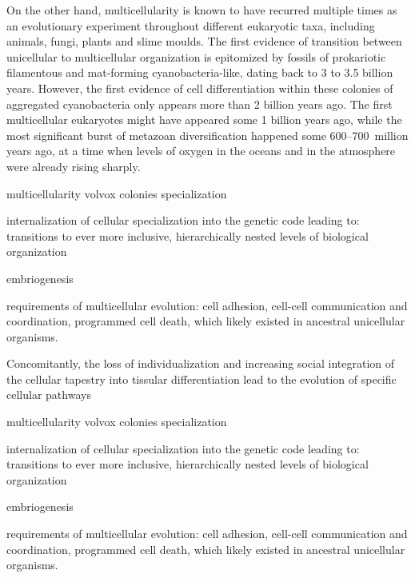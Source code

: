 \documentclass{tufte-book}
\begin{document}

On the other hand, multicellularity is known to have recurred multiple times as
an evolutionary experiment throughout different eukaryotic taxa, including
animals, fungi, plants and slime moulds.\cite{kaiser_building_2001} The first
evidence of transition between unicellular to multicellular organization is
epitomized by fossils of prokariotic filamentous and \mbox{mat-forming}
\mbox{cyanobacteria-like}, dating back to 3 to 3.5 billion
years.\cite{knoll_life_2003,schopf_microfossils_1993} However, the first
evidence of cell differentiation within these colonies of aggregated
cyanobacteria only appears more than 2 billion years
ago.\cite{tomitani_evolutionary_2006} The first multicellular eukaryotes might
have appeared some 1 billion years ago\cite{knoll_eukaryotic_2006}, while the
most significant burst of metazoan diversification happened some
\mbox{600--700~million} years ago, at a time when levels of oxygen in the oceans
and in the atmosphere were already rising
sharply.\cite{knoll_life_2003,schopf_microfossils_1993}



multicellularity
volvox
colonies
specialization

internalization of cellular specialization into the genetic code leading to:
transitions to ever more inclusive, hierarchically nested levels of biological
organization

embriogenesis

requirements of multicellular evolution: cell adhesion, cell-cell communication
and coordination, programmed cell death, which likely existed in ancestral
unicellular organisms\cite{grosberg_evolution_2007}.

Concomitantly, the loss of individualization and increasing social integration
of the cellular tapestry into tissular differentiation lead to the evolution of
specific cellular pathways


multicellularity
volvox
colonies
specialization

internalization of cellular specialization into the genetic code leading to:
transitions to ever more inclusive, hierarchically nested levels of biological
organization

embriogenesis

requirements of multicellular evolution: cell adhesion, cell-cell communication
and coordination, programmed cell death, which likely existed in ancestral
unicellular organisms\cite{grosberg_evolution_2007}.
\end{document}
